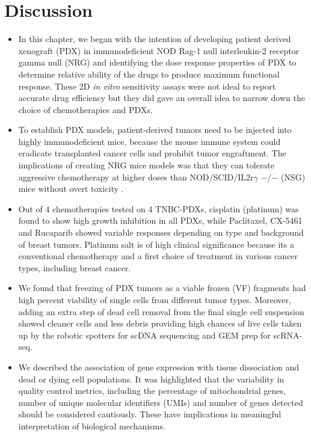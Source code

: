 \section{Discussion}

\begin{itemize}

 \item In this chapter, we began with the intention of developing patient derived xenograft (PDX) in immunodeficient NOD Rag-1 null interleukin-2 receptor gamma null (NRG) and identifying the dose response properties of PDX to determine relative ability of the drugs to produce maximum functional response. These 2D \textit{in vitro} sensitivity assays were not ideal to report accurate drug efficiency but they did gave an overall idea to narrow down the choice of chemotherapies and PDXs.  

 \item To establish PDX models, patient-derived tumors need to be injected into highly immunodeficient mice, because the mouse immune system could eradicate transplanted cancer cells and prohibit tumor engraftment. The implications of creating \ac{NRG} mice models was that they can tolerate aggressive chemotherapy at higher doses than NOD/SCID/IL2r$\gamma$ $-$/$-$ (NSG) mice without overt toxicity \cite{barve2018comparative}. 


\item Out of 4 chemotherapies tested on 4 TNBC-PDXs, cisplatin (platinum) was found to show high growth inhibition in all PDXs, while Paclitaxel, CX-5461 and Rucaparib showed variable responses depending on type and background of breast tumors. Platinum salt is of high clinical significance because its a conventional chemotherapy and a first choice of treatment in various cancer types, including breast cancer.

\item We found that freezing of PDX tumors as a viable frozen (VF) fragments had high percent viability of single cells from different tumor types. Moreover, adding an extra step of dead cell removal from the final single cell suspension showed cleaner cells and less debris  providing high chances of live cells taken up by the robotic spotters for scDNA sequencing and GEM prep for scRNA-seq.

\item We described the association of gene expression with tissue dissociation and dead or dying cell populations. It was highlighted that the variability in quality control metrics, including the percentage of mitochondrial genes, number of unique molecular identifiers (UMIs) and number of genes detected should be considered cautiously. These have implications in meaningful interpretation of biological mechanisms.


\end{itemize}

